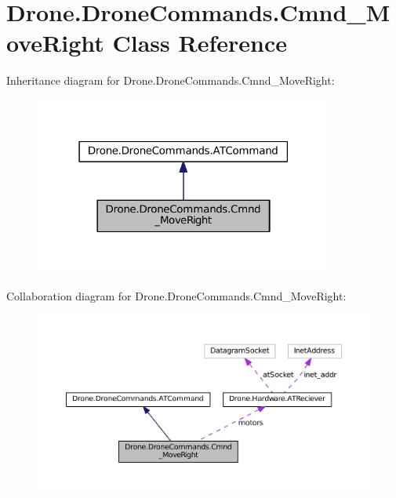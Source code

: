 \hypertarget{class_drone_1_1_drone_commands_1_1_cmnd___move_right}{}\section{Drone.\+Drone\+Commands.\+Cmnd\+\_\+\+Move\+Right Class Reference}
\label{class_drone_1_1_drone_commands_1_1_cmnd___move_right}


Inheritance diagram for Drone.\+Drone\+Commands.\+Cmnd\+\_\+\+Move\+Right\+:\nopagebreak
\begin{figure}[H]
\begin{center}
\leavevmode
\includegraphics[width=279pt]{class_drone_1_1_drone_commands_1_1_cmnd___move_right__inherit__graph}
\end{center}
\end{figure}


Collaboration diagram for Drone.\+Drone\+Commands.\+Cmnd\+\_\+\+Move\+Right\+:\nopagebreak
\begin{figure}[H]
\begin{center}
\leavevmode
\includegraphics[width=350pt]{class_drone_1_1_drone_commands_1_1_cmnd___move_right__coll__graph}
\end{center}
\end{figure}
